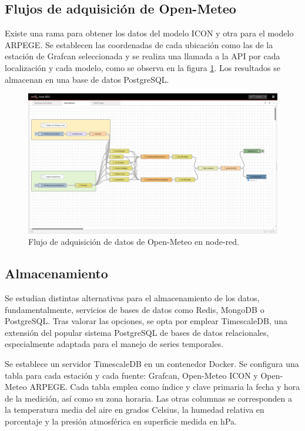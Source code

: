 \subsection{Flujos de adquisición de Open-Meteo}
Existe una rama para obtener los datos del modelo ICON y otra para el modelo ARPEGE. Se establecen las coordenadas de cada ubicación como las de la estación de Grafcan seleccionada 
y se realiza una llamada a la API por cada localización y cada modelo, como se observa en la figura \ref{open-meteo_flows}. 
Los resultados se almacenan en una base de datos PostgreSQL.
\begin{figure}[htb]
   \centering
   \includegraphics[width=1\linewidth]{images/node-red_open-meteo.png}
   \caption{Flujo de adquisición de datos de Open-Meteo en node-red.}
   \label{open-meteo_flows}
\end{figure}

\subsection{Almacenamiento}
Se estudian distintas alternativas para el almacenamiento de los datos, fundamentalmente, servicios de bases de datos como Redis, MongoDB o PostgreSQL.
Tras valorar las opciones, se opta por emplear TimescaleDB, una extensión del popular sistema PostgreSQL
de bases de datos relacionales, especialmente adaptada para el manejo de series temporales. 

Se establece un servidor TimescaleDB en un contenedor Docker. Se configura una tabla para cada estación y cada fuente: Grafcan, Open-Meteo ICON y Open-Meteo ARPEGE. 
Cada tabla emplea como índice y clave primaria la fecha y hora de la medición, así como su zona horaria. Las otras columnas se corresponden a la temperatura media del aire
 en grados Celsius, la humedad relativa en porcentaje y la presión atmosférica en superficie medida en hPa.

